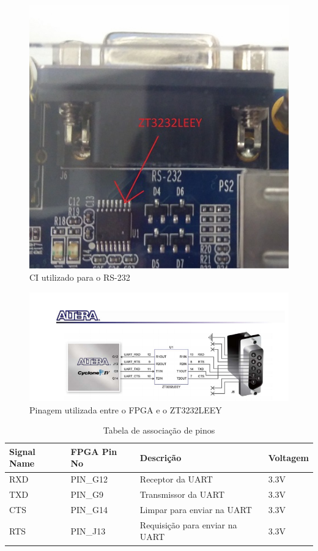 \documentclass[12pt]{article} %
\begin{document}
\begin{figure}[!h]
\centering
	\includegraphics[scale=0.5]{imagens/IMG_20171123_110859}
	\caption{CI utilizado para o RS-232}
	\label{Rotulo}
\end{figure}

\begin{figure}[!h]
\centering
	\includegraphics{imagens/conex_o.png}
	\caption{Pinagem utilizada entre o FPGA e o ZT3232LEEY}
	\label{Rotulo}
\end{figure}


\begin{table}
\centering
\caption{Tabela de associação de pinos}
\label{pin_assignment}
\begin{tabular}{|l|l|l|l|}
\hline
Signal Name & FPGA Pin No & Descrição                      & Voltagem \\ \hline
RXD         & PIN\_G12    & Receptor da UART               & 3.3V     \\ \hline
TXD         & PIN\_G9     & Transmissor da UART            & 3.3V     \\ \hline
CTS         & PIN\_G14    & Limpar para enviar na UART     & 3.3V     \\ \hline
RTS         & PIN\_J13    & Requisição para enviar na UART & 3.3V     \\ \hline
\end{tabular}
\end{table}
\end{document}
